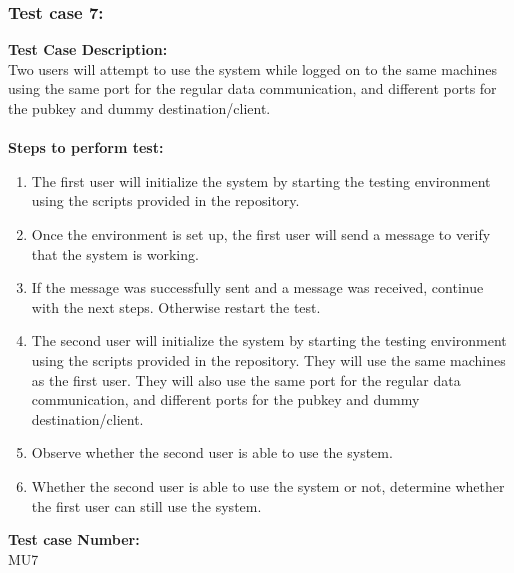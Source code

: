\documentclass{article}
\begin{document}
\subsubsection{Test case 7: }
\textbf{Test Case Description:\\} Two users will attempt to use the system while logged on to the same machines using the same port for the regular data communication, and different ports for the pubkey and dummy destination/client.\\\\
\textbf{Steps to perform test: } 
\begin{enumerate}
    \item The first user will initialize the system by starting the testing environment using the scripts provided in the repository.
    \item Once the environment is set up, the first user will send a message to verify that the system is working.
    \item If the message was successfully sent and a message was received, continue with the next steps. Otherwise restart the test.
    \item The second user will initialize the system by starting the testing environment using the scripts provided in the repository. They will use the same machines as the first user. They will also use the same port for the regular data communication, and different ports for the pubkey and dummy destination/client.
    \item Observe whether the second user is able to use the system.
    \item Whether the second user is able to use the system or not, determine whether the first user can still use the system.
\end{enumerate}
\textbf{Test case Number: \\} MU7
\end{document}
